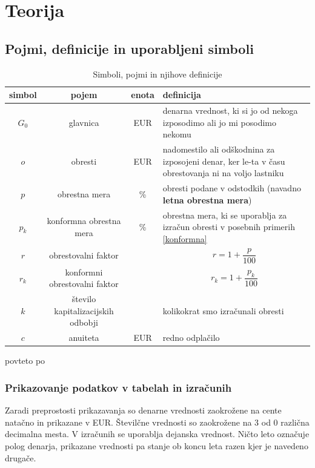\documentclass[12pt]{article}
\begin{document}
\section{Teorija}
    \subsection{Pojmi, definicije in uporabljeni simboli}
        \begin{table}[h!]
            \centering
            \begin{tabular}{|c|c|c|p{7cm}|}
                \hline
                \textbf{simbol} & \textbf{pojem} & \textbf{enota} & \textbf{definicija} \\ \hline
                $G_0$ & glavnica                & EUR    & denarna vrednost, ki si jo od nekoga izposodimo ali jo mi posodimo nekomu \\ \hline 
                $o$   & obresti                 & EUR    & nadomestilo ali odškodnina za izposojeni denar, ker le-ta v času obrestovanja ni na voljo lastniku \\ \hline
                $p$   & obrestna mera           & \%     & obresti podane v odstodkih (navadno \textbf{letna obrestna mera}) \\ \hline
                $p_k$ & konformna obrestna mera & \%     & obrestna mera, ki se uporablja za izračun obresti v posebnih primerih \ref{konformna} \\ \hline
                $r$   & obrestovalni faktor     &        & $$r = 1 + \frac{p}{100}$$ \\ \hline
                $r_k$ & konformni obrestovalni faktor &  & $$r_k = 1 + \frac{p_k}{100}$$ \\ \hline
                $k$   & število kapitalizacijskih odbobji &  & kolikokrat smo izračunali obresti \\ \hline
                $c$   & anuiteta                & EUR    & redno odplačilo \\ \hline
            \end{tabular}

            \medskip
            \centering povteto po \cite{vega4}
            \caption{Simboli, pojmi in njihove definicije}
            \label{tab:simboli}
        \end{table}

        \subsubsection{Prikazovanje podatkov v tabelah in izračunih}
        Zaradi preprostosti prikazavanja so denarne vrednosti zaokrožene na cente natačno
        in prikazane v EUR. Številčne vrednosti so zaokrožene na 3 od 0 različna decimalna 
        mesta. V izračunih se uporablja dejanska vrednost. Ničto leto označuje polog denarja,
        prikazane vrednosti pa stanje ob koncu leta razen kjer je navedeno drugače. 
\end{document}

